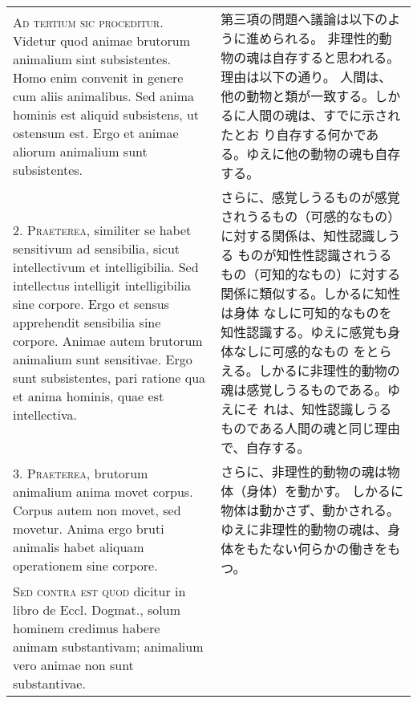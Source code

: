 \documentclass[10pt]{jsarticle} %
\begin{document}
\begin{longtable}{p{21em}p{21em}}

{\scshape Ad tertium sic proceditur}. Videtur quod animae brutorum animalium sint
subsistentes. Homo enim convenit in genere cum aliis animalibus. Sed
anima hominis est aliquid subsistens, ut ostensum est. Ergo et animae
aliorum animalium sunt subsistentes.

&

第三項の問題へ議論は以下のように進められる。
非理性的動物の魂は自存すると思われる。理由は以下の通り。
人間は、他の動物と類が一致する。しかるに人間の魂は、すでに示されたとお
 り自存する何かである。ゆえに他の動物の魂も自存する。

\\



2. {\scshape Praeterea}, similiter se habet sensitivum ad sensibilia, sicut
intellectivum et intelligibilia. Sed intellectus intelligit
intelligibilia sine corpore. Ergo et sensus apprehendit sensibilia
sine corpore. Animae autem brutorum animalium sunt sensitivae. Ergo
sunt subsistentes, pari ratione qua et anima hominis, quae est
intellectiva.

&


さらに、感覚しうるものが感覚されうるもの（可感的なもの）に対する関係は、知性認識しうる
 ものが知性性認識されうるもの（可知的なもの）に対する関係に類似する。しかるに知性は身体
 なしに可知的なものを知性認識する。ゆえに感覚も身体なしに可感的なもの
 をとらえる。しかるに非理性的動物の魂は感覚しうるものである。ゆえにそ
 れは、知性認識しうるものである人間の魂と同じ理由で、自存する。


\\



3. {\scshape Praeterea}, brutorum animalium anima movet corpus. Corpus autem non
movet, sed movetur. Anima ergo bruti animalis habet aliquam
operationem sine corpore.

&

さらに、非理性的動物の魂は物体（身体）を動かす。
しかるに物体は動かさず、動かされる。
ゆえに非理性的動物の魂は、身体をもたない何らかの働きをもつ。

\\



{\scshape Sed contra est quod} dicitur in libro de Eccl. Dogmat., solum hominem
credimus habere animam substantivam; animalium vero animae non sunt
substantivae.

&


\end{longtable}
\end{document}

